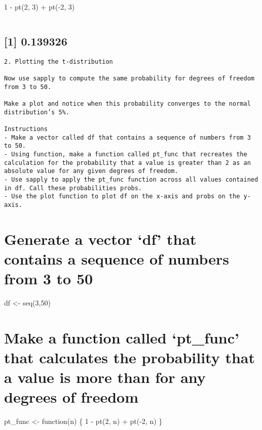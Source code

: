 \documentclass[
]{article}
\begin{document}
1 - pt(2, 3) + pt(-2, 3)

\begin{verbatim}
\end{verbatim}

\hypertarget{section-1}{%
\subsection{{[}1{]} 0.139326}\label{section-1}}

\begin{verbatim}
2. Plotting the t-distribution

Now use sapply to compute the same probability for degrees of freedom from 3 to 50.

Make a plot and notice when this probability converges to the normal distribution’s 5%.

Instructions
- Make a vector called df that contains a sequence of numbers from 3 to 50.
- Using function, make a function called pt_func that recreates the calculation for the probability that a value is greater than 2 as an absolute value for any given degrees of freedom.
- Use sapply to apply the pt_func function across all values contained in df. Call these probabilities probs.
- Use the plot function to plot df on the x-axis and probs on the y-axis.
\end{verbatim}

\hypertarget{generate-a-vector-df-that-contains-a-sequence-of-numbers-from-3-to-50}{%
\section{Generate a vector `df' that contains a sequence of numbers from
3 to
50}\label{generate-a-vector-df-that-contains-a-sequence-of-numbers-from-3-to-50}}

df \textless- seq(3,50)

\hypertarget{make-a-function-called-pt_func-that-calculates-the-probability-that-a-value-is-more-than-2-for-any-degrees-of-freedom}{%
\section{Make a function called `pt\_func' that calculates the
probability that a value is more than \textbar{} for any
degrees of
freedom}\label{make-a-function-called-pt_func-that-calculates-the-probability-that-a-value-is-more-than-2-for-any-degrees-of-freedom}}

pt\_func \textless- function(n) \{ 1 - pt(2, n) + pt(-2, n) \}
\end{document}
